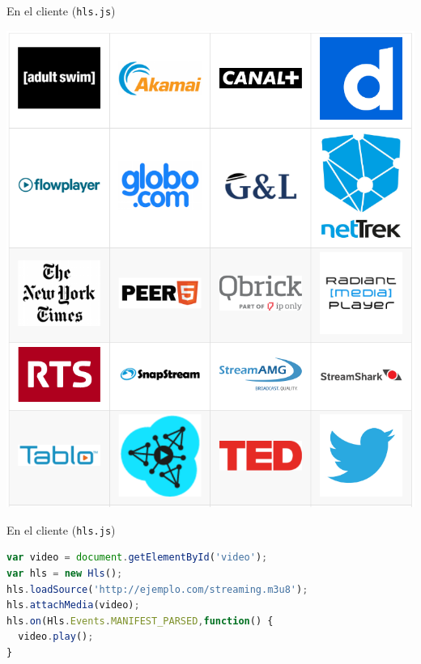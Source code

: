 \documentclass[10pt,compress,usetitleprogressbar,mathserif]{beamer}
\begin{document}
\begin{frame}{En el cliente (\texttt{hls.js})}
  \begin{center}
    \includegraphics[scale=0.2]{img/usohls.png}
  \end{center}
\end{frame}

\begin{frame}[fragile]{En el cliente (\texttt{hls.js})}
\begin{lstlisting}[language=JavaScript]
var video = document.getElementById('video');
var hls = new Hls();
hls.loadSource('http://ejemplo.com/streaming.m3u8');
hls.attachMedia(video);
hls.on(Hls.Events.MANIFEST_PARSED,function() {
  video.play();
}
\end{lstlisting}
\end{frame}
\end{document}
